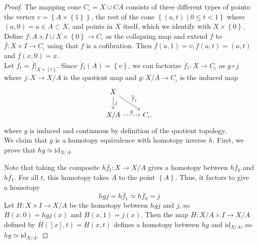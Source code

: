 \documentclass[reqno]{amsart}
\theoremstyle{definition}
\theoremstyle{remark}
\newcommand{\id}{{\mathrm{id}}}
\begin{document}
\begin{proof}
    The mapping cone $C_{\iota} = X
    \cup CA$ consists of three different types of
    points: the vertex $v = \left\{ A \times \left\{ 1 \right\} 
    \right\} $, the rest of the cone
    $\left\{ \left( a,t \right)  \mid 0\le t < 1 \right\} $ 
    where $\left( a,0 \right) = a \in A \subset X$, and
    points in $X$ itself, which we identify with $X \times 
    \left\{ 0 \right\} $.\\
    Define $f \colon A \times I \cup  X \times \left\{ 0 \right\} 
    \to C_{\iota}$ as the collapsing map and extend
    $f$ to $\overline{f} \colon X \times I \to 
    C_{\iota}$ using that $f$ is a cofibration. 
    Then $\overline{f}\left( a,1 \right) =
    v, \overline{f}(a,t) = (a,t)$ and
    $\overline{f}(x,0) = x$.\\
    Let $\overline{f}_t = 
    \overline{f}|_{X \times \left\{ t \right\} }$.
    Since $\overline{f}_1 (A) = \left\{ v \right\} $, 
    we can factorize $\overline{f}_1 \colon
    X \to C_{\iota}$ as
    $g \circ j$ where
    $j \colon X \to X /A$ is the quotient map
    and $g \colon X / A \to C_{\iota}$ is
    the induced map
    \begin{equation*}
    \begin{tikzcd}
        X \ar[d, "j"] \ar[dr, "\overline{f}_1"] & \\
        X / A \ar[r, "g", dashed] & C_{\iota}.
    \end{tikzcd}
    \end{equation*}
    where $g$ is induced and continuous by
    definition of the quotient topology.\\
    We claim that $g$ is a homotopy equivalence with
    homotopy inverse $h$.
    First, we prove that $hg \simeq \id_{X / A}$.

    Note that taking the composite
    $h \overline{f}_t \colon X \to X / A$ gives a homotopy
    between $h \overline{f}_0$ and $h \overline{f}_1$.
    For all $t$, this homotopy takes
    $A$ to the point $\left\{ A \right\} $. Thus, it
    factors to give a homotopy
    \[
    hgj = h \overline{f}_1 
    \simeq h \overline{f}_0 = j
    \] 
    Let $H \colon X \times I \to X / A$ be the homotopy
    between $hgj$ and $j$, so
    $H(x, 0) = hgj(x)$ and
    $H(x,1) = j(x)$. Then
    the map
    $\overline{H} \colon X / A \times I \to X / A$ defined
    by
    $\overline{H}(\left[ x \right] ,t) = 
    H\left( x,t \right) $ defines a homotopy
    between $hg$ and $\id_{X / A}$, so
    $hg \simeq \id_{X / A}$.


\end{proof}
\end{document}
